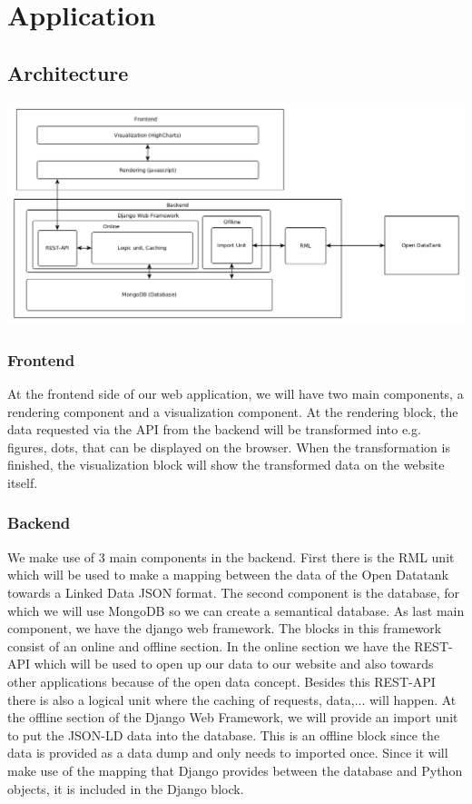 \chapter{Application}
\section{Architecture}
\includegraphics[width=16cm]{fig/Architecture}

\subsection{Frontend}
At the frontend side of our web application, we will have two main components, a rendering component and a visualization component. At the rendering block, the data requested via the API from the backend will be transformed into e.g. figures, dots, that can be displayed on the browser. When the transformation is finished, the visualization block will show the transformed data on the website itself.

\subsection{Backend}
We make use of 3 main components in the backend. First there is the RML unit which will be used to make a mapping between the data of the Open Datatank towards a Linked Data JSON format. The second component is the database, for which we will use MongoDB so we can create a semantical database. As last main component, we have the django web framework. The blocks in this framework consist of an online and offline section. In the online section we have the REST-API which will be used to open up our data to our website and also towards other applications because of the open data concept. Besides this REST-API there is also a logical unit where the caching of requests, data,... will happen. At the offline section of the Django Web Framework, we will provide an import unit to put the JSON-LD data into the database. This is an offline block since the data is provided as a data dump and only needs to imported once. Since it will make use of the mapping that Django provides between the database and Python objects, it is included in the Django block.

